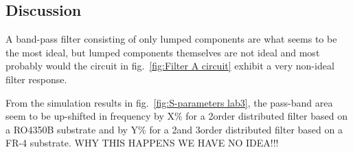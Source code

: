 \documentclass[report.tex]{subfiles}
\begin{document}
\subsection{Discussion}

A band-pass filter consisting of only lumped components are what seems to be the most ideal, but lumped components themselves are not ideal and most probably would the circuit in fig.~\ref{fig:Filter A circuit} exhibit a very non-ideal filter response.

From the simulation results in fig.~\ref{fig:S-parameters lab3}, the pass-band area seem to be up-shifted in frequency by X\% for a 2\nd order distributed filter based on a RO4350B substrate and by Y\% for a 2\nd and 3\rd order distributed filter based on a FR-4 substrate. WHY THIS HAPPENS WE HAVE NO IDEA!!!
\end{document}
